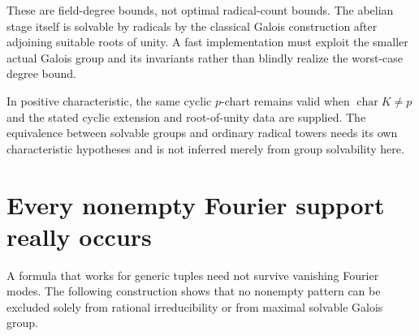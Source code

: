 \documentclass[11pt,a4paper]{article}
\theoremstyle{definition}
\theoremstyle{remark}
\newcommand{\charac}{\operatorname{char}}
\begin{document}
These are field-degree bounds, not optimal radical-count bounds. The
abelian stage itself is solvable by radicals by the classical Galois
construction after adjoining suitable roots of unity. A fast implementation
must exploit the smaller actual Galois group and its invariants rather than
blindly realize the worst-case degree bound.

In positive characteristic, the same cyclic $p$-chart remains valid when
$\charac K\neq p$ and the stated cyclic extension and root-of-unity data
are supplied. The equivalence between solvable groups and ordinary radical
towers needs its own characteristic hypotheses and is not inferred merely
from group solvability here.

\section{Every nonempty Fourier support really occurs}
\label{sec:support}

A formula that works for generic tuples need not survive vanishing Fourier
modes. The following construction shows that no nonempty pattern can be
excluded solely from rational irreducibility or from maximal solvable
Galois group.
\end{document}
